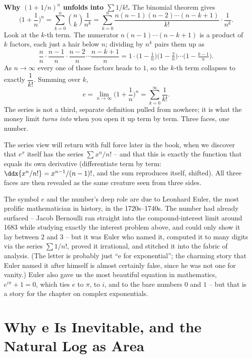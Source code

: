 \begin{whybox}
\textbf{Why $(1+1/n)^n$ unfolds into $\sum 1/k!$.} The binomial theorem gives
\[
\Big(1+\frac1n\Big)^{n} = \sum_{k=0}^{n}\binom{n}{k}\frac{1}{n^{k}}
= \sum_{k=0}^{n}\frac{n(n-1)(n-2)\cdots(n-k+1)}{k!}\cdot\frac{1}{n^{k}}.
\]
Look at the $k$-th term. The numerator $n(n-1)\cdots(n-k+1)$ is a product of $k$ factors, each just a hair below $n$; dividing by $n^{k}$ pairs them up as
\[
\frac{n}{n}\cdot\frac{n-1}{n}\cdot\frac{n-2}{n}\cdots\frac{n-k+1}{n}
= 1\cdot\Big(1-\tfrac1n\Big)\Big(1-\tfrac2n\Big)\cdots\Big(1-\tfrac{k-1}{n}\Big).
\]
As $n\to\infty$ every one of those factors heads to $1$, so the $k$-th term collapses to exactly $\dfrac{1}{k!}$. Summing over $k$,
\[
e=\lim_{n\to\infty}\Big(1+\frac1n\Big)^n = \sum_{k=0}^{\infty}\frac{1}{k!}.
\]
The series is not a third, separate definition pulled from nowhere; it is what the money limit \emph{turns into} when you open it up term by term. Three faces, one number.
\end{whybox}

The series view will return with full force later in the book, when we discover that $e^x$ itself has the series $\sum x^n/n!$ -- and that this is exactly the function that equals its own derivative (differentiate term by term: $\ddx{x^n/n!} = x^{n-1}/(n-1)!$, and the sum reproduces itself, shifted). All three faces are then revealed as the same creature seen from three sides.

\begin{historybox}
The symbol $e$ and the number's deep role are due to Leonhard Euler, the most prolific mathematician in history, in the 1720s--1740s. The number had already surfaced -- Jacob Bernoulli ran straight into the compound-interest limit around 1683 while studying exactly the interest problem above, and could only show it lay between $2$ and $3$ -- but it was Euler who named it, computed it to many digits via the series $\sum 1/n!$, proved it irrational, and stitched it into the fabric of analysis. (The letter is probably just ``e for exponential''; the charming story that Euler named it after himself is almost certainly false, since he was not one for vanity.) Euler also gave us the most beautiful equation in mathematics, $e^{i\pi}+1=0$, which ties $e$ to $\pi$, to $i$, and to the bare numbers $0$ and $1$ -- but that is a story for the chapter on complex exponentials.
\end{historybox}

\section{Why e Is Inevitable, and the Natural Log as Area}

